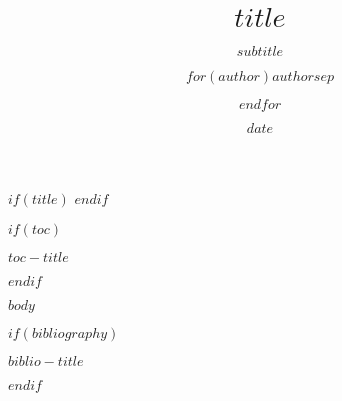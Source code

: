 \documentclass[$if(fontsize)$$fontsize$,$endif$$if(lang)$$babel-lang$,$endif$$if(handout)$handout,$endif$$if(beamer)$ignorenonframetext,$endif$$for(classoption)$$classoption$$sep$,$endfor$,t]{$documentclass$}
\title{$title$}
\subtitle{$subtitle$}
\author{$for(author)$$author$$sep$ \and $endfor$}
\institute{$institute$}
\date{$date$}
\newif\ifbibliography
\begin{document}
$if(title)$
\frame{\titlepage}
$endif$


$if(toc)$
\begin{frame}{$toc-title$}
\tableofcontents[hideallsubsections]
\end{frame}
$endif$

$body$

$if(bibliography)$
  \begin{frame}[t,allowframebreaks]{$biblio-title$}
  \bibliographytrue
  \printbibliography[heading=none]
  \end{frame}
$endif$
\end{document}
